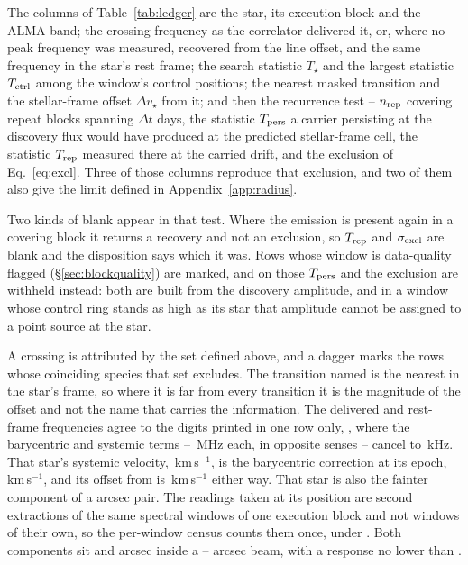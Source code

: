 The columns of Table~\ref{tab:ledger} are the star, its execution block and
the ALMA band; the crossing frequency as the correlator delivered it, or,
where no peak frequency was measured, recovered from the line offset, and the
same frequency in the star's rest frame; the search statistic $T_\star$ and
the largest statistic $T_{\rm ctrl}$ among the window's \NCtrl{} control
positions; the nearest masked transition and the stellar-frame offset
$\Delta v_\star$ from it; and then the recurrence test -- $n_{\rm rep}$
covering repeat blocks spanning $\Delta t$ days, the statistic $T_{\rm pers}$
a carrier persisting at the discovery flux would have produced at the
predicted stellar-frame cell, the statistic $T_{\rm rep}$ measured there at
the carried drift, and the exclusion of Eq.~\ref{eq:excl}. Three of those
columns reproduce that exclusion, and two of them also give the limit defined
in Appendix~\ref{app:radius}.

Two kinds of blank appear in that test. Where the emission is present again in
a covering block it returns a recovery and not an exclusion, so
$T_{\rm rep}$ and $\sigma_{\rm excl}$ are blank and the disposition says which
it was. Rows whose window is data-quality flagged
(\S\ref{sec:blockquality}) are marked, and on those $T_{\rm pers}$ and the
exclusion are withheld instead: both are built from the discovery amplitude,
and in a window whose control ring stands as high as its star that amplitude
cannot be assigned to a point source at the star.

A crossing is attributed by the set defined above, and a dagger marks the
\MkNSODecide{} rows whose coinciding species that set excludes. The
transition named is the nearest in the star's frame, so where it is far from
every transition it is the magnitude of the offset and not the name that
carries the information. The delivered and rest-frame frequencies agree to
the digits printed in one row only, \MkCancStar, where the barycentric and
systemic terms -- \MkCancBaryMHz\,MHz each, in opposite senses -- cancel to
\MkCancNetkHz\,kHz. That star's systemic velocity,
\MkCancVSys\,km\,s$^{-1}$, is the barycentric correction at its epoch,
\MkCancVBary\,km\,s$^{-1}$, and its offset from \MkCancLine{} is
\MkCancDv\,km\,s$^{-1}$ either way. That star is also the fainter component
of a \CenPairSep{} arcsec pair. The
\CenPairNWin{} readings taken at its position are second extractions of the
same \CenPairNWin{} spectral windows of one execution block and not windows
of their own, so the per-window census counts them once, under
\CenPairNameA. Both components sit \CenPairOffA{} and \CenPairOffB{} arcsec
inside a \CenPairPbFwhmLo--\CenPairPbFwhmHi{} arcsec beam, with a response no
lower than \CenPairPbRespLo.

\begin{table}
\centering
\caption{\textbf{The crossing ledger, from which every disposition in this
paper can be reproduced.} All \EvNCrossRaw{} threshold crossings, one to a
window, including the \EvNCrossFlag{} in the failing block of
\S\ref{sec:bdblock}. The columns, the blanks and the dagger are defined
in \S\ref{sec:ledgercolumns}. Block identifiers omit the constant
\texttt{A002\_} prefix.}
\label{tab:ledger}
\scriptsize

\end{table}
